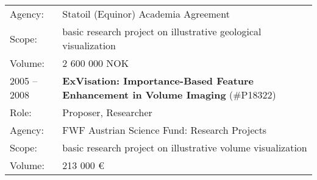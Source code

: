 \documentclass[a4paper,11pt]{letter}
\begin{document}
\begin{tabular}{l| l}
Agency: & Statoil (Equinor) Academia Agreement \\
Scope: & basic research project on illustrative geological visualization \\
Volume: & 2 600 000 NOK \\
\hline
2005 -- 2008 & \textbf{ExVisation: Importance-Based Feature Enhancement in Volume Imaging} (\#P18322) \\
Role: & Proposer, Researcher \\
Agency: & FWF Austrian Science Fund: Research Projects \\
Scope: & basic research project on illustrative volume visualization \\
Volume: &  213 000 \euro{} \\
\hline
\end{tabular}
\end{document}
